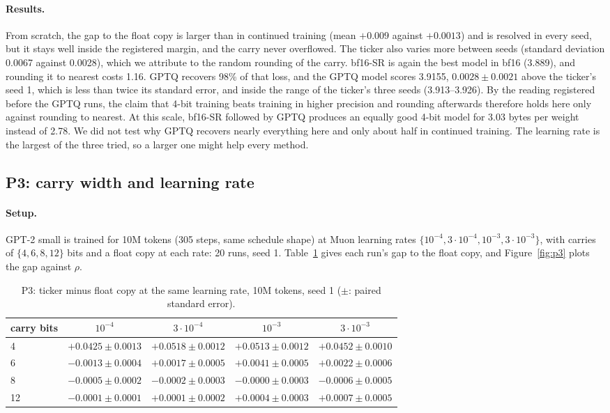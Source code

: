 \documentclass[11pt]{article}
\begin{document}
\paragraph{Results.} From scratch, the gap to the float copy is larger than in continued training (mean $+0.009$
against $+0.0013$) and is resolved in every seed, but it stays well inside the registered margin, and the carry never
overflowed. The ticker also varies more between seeds (standard deviation 0.0067 against 0.0028), which we attribute
to the random rounding of the carry. bf16-SR is again the best model in bf16 (3.889), and rounding it to nearest costs
1.16. GPTQ recovers 98\% of that loss, and the GPTQ model scores 3.9155, $0.0028 \pm 0.0021$ above the ticker's seed 1,
which is less than twice its standard error, and inside the range of the ticker's three seeds (3.913--3.926). By the
reading registered before the GPTQ runs, the claim that 4-bit training beats training in higher precision and
rounding afterwards therefore holds here only against rounding to nearest. At this scale, bf16-SR followed by GPTQ
produces an equally good 4-bit model for 3.03 bytes per weight instead of 2.78. We did not test why GPTQ recovers
nearly everything here and only about half in continued training. The learning rate is the largest of the three
tried, so a larger one might help every method.

\subsection{P3: carry width and learning rate}\label{sec:p3}
\paragraph{Setup.} GPT-2 small is trained for 10M tokens (305 steps, same schedule shape) at Muon learning rates
$\{10^{-4}, 3\cdot10^{-4}, 10^{-3}, 3\cdot10^{-3}\}$, with carries of $\{4,6,8,12\}$ bits and a float copy at each
rate: 20 runs, seed 1. Table~\ref{tab:p3} gives each run's gap to the float copy, and Figure~\ref{fig:p3} plots the gap
against $\rho$.

\begin{table}[t]
\centering
\caption{P3: ticker minus float copy at the same learning rate, 10M tokens, seed 1 ($\pm$: paired standard error).}
\label{tab:p3}
\small
\begin{tabular}{lcccc}
\toprule
carry bits & $10^{-4}$ & $3\cdot10^{-4}$ & $10^{-3}$ & $3\cdot10^{-3}$ \\
\midrule
4 & $+0.0425 \pm 0.0013$ & $+0.0518 \pm 0.0012$ & $+0.0513 \pm 0.0012$ & $+0.0452 \pm 0.0010$ \\
6 & $-0.0013 \pm 0.0004$ & $+0.0017 \pm 0.0005$ & $+0.0041 \pm 0.0005$ & $+0.0022 \pm 0.0006$ \\
8 & $-0.0005 \pm 0.0002$ & $-0.0002 \pm 0.0003$ & $-0.0000 \pm 0.0003$ & $-0.0006 \pm 0.0005$ \\
12 & $-0.0001 \pm 0.0001$ & $+0.0001 \pm 0.0002$ & $+0.0004 \pm 0.0003$ & $+0.0007 \pm 0.0005$ \\
\bottomrule
\end{tabular}
\end{table}
\end{document}
